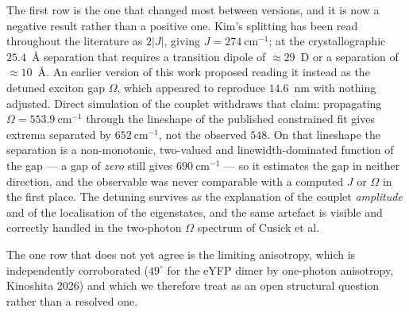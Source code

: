 \documentclass[11pt,a4paper]{article}
\begin{document}
The first row is the one that changed most between versions, and it is now a
negative result rather than a positive one. Kim's splitting has been read
throughout the literature as $2|J|$, giving $J = 274~\mathrm{cm^{-1}}$; at the
crystallographic $25.4$~\AA{} separation that requires a transition dipole of
$\approx 29$~D or a separation of $\approx 10$~\AA. An earlier version of this
work proposed reading it instead as the detuned exciton gap $\Omega$, which
appeared to reproduce $14.6$~nm with nothing adjusted. Direct simulation of the
couplet withdraws that claim: propagating $\Omega = 553.9~\mathrm{cm^{-1}}$
through the lineshape of the published constrained fit gives extrema separated
by $652~\mathrm{cm^{-1}}$, not the observed $548$. On that lineshape the
separation is a non-monotonic, two-valued and linewidth-dominated function of
the gap --- a gap of \emph{zero} still gives $690~\mathrm{cm^{-1}}$ --- so it
estimates the gap in neither direction, and the observable was never comparable
with a computed $J$ or $\Omega$ in the first place. The detuning survives as the
explanation of the couplet \emph{amplitude} and of the localisation of the
eigenstates, and the same artefact is visible and correctly handled in the
two-photon $\Omega$ spectrum of Cusick et al.

The one row that does not yet agree is the limiting anisotropy, which is
independently corroborated ($49^\circ$ for the eYFP dimer by one-photon
anisotropy, Kinoshita 2026) and which we therefore treat as an open structural
question rather than a resolved one.
\end{document}
